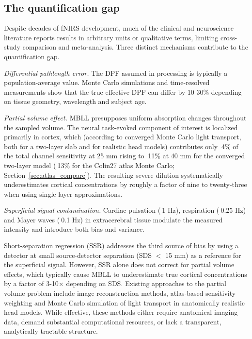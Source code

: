 \documentclass[11pt]{article}
\def\sim{~}%
\def\,{ }%
\begin{document}
\subsection{The quantification gap}

Despite decades of fNIRS development, much of the clinical and neuroscience literature reports results in arbitrary units or qualitative terms, limiting cross-study comparison and meta-analysis\cite{r2}. Three distinct mechanisms contribute to the quantification gap.

\textit{Differential pathlength error.} The DPF assumed in processing is typically a population-average value. Monte Carlo simulations and time-resolved measurements show that the true effective DPF can differ by 10-30\% depending on tissue geometry, wavelength and subject age\cite{r12,r14}.

\textit{Partial volume effect.} MBLL presupposes uniform absorption changes throughout the sampled volume. The neural task-evoked component of interest is localized primarily in cortex, which (according to converged Monte Carlo light transport, both for a two-layer slab and for realistic head models\cite{r10,r12}) contributes only $\sim$4\% of the total channel sensitivity at 25\,mm rising to $\sim$11\% at 40\,mm for the converged two-layer model ($\sim$13\% for the Colin27 atlas Monte Carlo\cite{r10}; Section~\ref{sec:atlas_compare}). The resulting severe dilution systematically underestimates cortical concentrations by roughly a factor of nine to twenty-three when using single-layer approximations.

\textit{Superficial signal contamination.} Cardiac pulsation ($\sim$1\,Hz), respiration ($\sim$0.25\,Hz) and Mayer waves ($\sim$0.1\,Hz) in extracerebral tissue modulate the measured intensity and introduce both bias and variance\cite{r15,r16,r17}.

Short-separation regression (SSR) addresses the third source of bias by using a detector at small source-detector separation (SDS $<$ 15\,mm) as a reference for the superficial signal\cite{r18,r19}. However, SSR alone does not correct for partial volume effects, which typically cause MBLL to underestimate true cortical concentrations by a factor of 3-10$\times$ depending on SDS\cite{r10,r13}. Existing approaches to the partial volume problem include image reconstruction methods\cite{r13}, atlas-based sensitivity weighting\cite{r10} and Monte Carlo simulation of light transport in anatomically realistic head models\cite{r12,r20}. While effective, these methods either require anatomical imaging data, demand substantial computational resources, or lack a transparent, analytically tractable structure.
\end{document}
